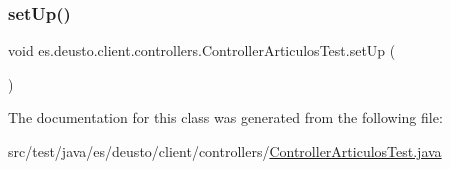 \subsubsection{\texorpdfstring{setUp()}{setUp()}}
{\footnotesize\ttfamily void es.\+deusto.\+client.\+controllers.\+Controller\+Articulos\+Test.\+set\+Up (\begin{DoxyParamCaption}{ }\end{DoxyParamCaption})}



The documentation for this class was generated from the following file\+:\begin{DoxyCompactItemize}
\item 
src/test/java/es/deusto/client/controllers/\mbox{\hyperlink{_controller_articulos_test_8java}{Controller\+Articulos\+Test.\+java}}\end{DoxyCompactItemize}
